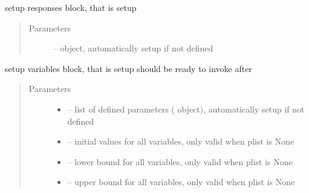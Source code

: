 \documentclass[letterpaper,10pt,english]{sphinxmanual}
\begin{document}
\begin{fulllineitems}
\begin{fulllineitems}
\begin{quote}
\begin{description}
\end{description}\end{quote}

\end{fulllineitems}


\begin{fulllineitems}
\label{\detokenize{src/apidocs/dakopt:genopt.dakopt.DakotaOC.set_responses}}
setup responses block, that is setup 
\begin{quote}\begin{description}
\item[{Parameters}] \leavevmode
{} --  object, automatically setup if not defined

\end{description}\end{quote}

\end{fulllineitems}


\begin{fulllineitems}
\label{\detokenize{src/apidocs/dakopt:genopt.dakopt.DakotaOC.set_variables}}
setup variables block, that is setup 
should be ready to invoke after 
\begin{quote}\begin{description}
\item[{Parameters}] \leavevmode\begin{itemize}
\item {} 
 -- list of defined parameters ( object), 
automatically setup if not defined

\item {} 
 -- initial values for all variables, only valid when plist is None

\item {} 
 -- lower bound for all variables, only valid when plist is None

\item {} 
 -- upper bound for all variables, only valid when plist is None


\end{itemize}
\end{description}
\end{quote}
\end{fulllineitems}
\end{fulllineitems}
\end{document}
